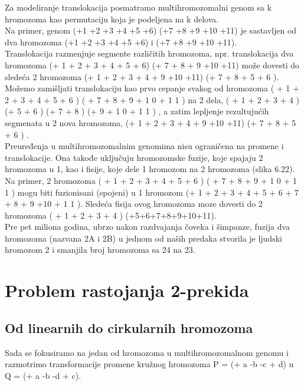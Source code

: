 Za modeliranje translokacija posmatramo multihromozomalni genom sa k hromozoma
kao permutaciju koja je podeljena na k delova.\\

Na primer, genom
(+1 +2 +3 +4 +5 +6) (+7 +8 +9 +10 +11) je sastavljen od dva hromozoma (+1
+2 +3 +4 +5 +6) i (+7 +8 +9 +10 +11). \\

Translokacija razmenjuje segmente
različitih hromozoma, npr. translokacija dva hromozoma
(+ 1 + 2 + 3 + 4 + 5 + 6) (+ 7 + 8 + 9 +10 +11)
može dovesti do sledeća 2 hromozoma
(+ 1 + 2 + 3 + 4 + 9 +10 +11) (+ 7 + 8 + 5 + 6 ).
Možemo zamišljati translokaciju kao prvo cepanje svakog od hromozoma
( + 1 + 2 + 3 + 4 + 5 + 6 ) ( + 7 + 8 + 9 + 1 0 + 1 1 )
na 2 dela,
( + 1 + 2 + 3 + 4 ) (+ 5 + 6 ) (+ 7 + 8 ) (+ 9 + 1 0 + 1 1 ) ,
a zatim lepljenje rezultujućih segmenata u 2 nova hromozoma,
(+ 1 + 2 + 3 + 4 + 9 +10 +11) (+ 7 + 8 + 5 + 6 ) .\\

Preuređenja u multihromozomalnim genomima nisu ograničena na promene i translokacije. Ona takođe uključuju hromozomske fuzije, koje spajaju 2 hromozoma u 1, kao i fisije, koje dele 1 hromozom na 2 hromozoma (slika 6.22).\\

Na primer, 2 hromozoma
( + 1 + 2 + 3 + 4 + 5 + 6 ) ( + 7 + 8 + 9 + 1 0 + 1 1 ) mogu biti fuzionisani (spojeni) u 1 hromozom (+ 1 + 2 + 3 + 4 + 5 + 6 + 7 + 8 + 9 +10 + 1 1 ).
Sledeća fisija ovog hromozoma moze dovesti do 2 hromozoma ( + 1 + 2 + 3 + 4 ) (+5+6+7+8+9+10+11).\\

Pre pet miliona godina, ubrzo nakon razdvajanja čoveka i šimpanze, fuzija
dva hromozoma (nazvana 2A i 2B) u jednom od naših predaka stvorila je ljudski hromozom 2 i smanjila broj hromozoma sa 24 na 23.

\section{Problem rastojanja 2-prekida}

\subsection{Od linearnih do cirkularnih hromozoma}

\indent Sada se fokusiramo na jedan od hromozoma u multihromozomalnom genomu i razmotrimo transformacije promene kružnog hromozoma P = (+ a -b -c + d) u Q = (+ a -b
-d + c). \\

